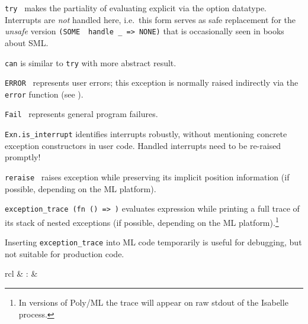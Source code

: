 \begin{isabellebody}
\begin{isamarkuptext}
  \begin{description}

  \item \verb|try|~ makes the partiality of evaluating
   explicit via the option datatype.  Interrupts are
  \emph{not} handled here, i.e.\ this form serves as safe replacement
  for the \emph{unsafe} version \verb|(SOME|~~\verb|handle _ => NONE)| that is occasionally seen in
  books about SML.

  \item \verb|can| is similar to \verb|try| with more abstract result.

  \item \verb|ERROR|~ represents user errors; this
  exception is normally raised indirectly via the \verb|error| function
  (see ).

  \item \verb|Fail|~ represents general program failures.

  \item \verb|Exn.is_interrupt| identifies interrupts robustly, without
  mentioning concrete exception constructors in user code.  Handled
  interrupts need to be re-raised promptly!

  \item \verb|reraise|~ raises exception 
  while preserving its implicit position information (if possible,
  depending on the ML platform).

  \item \verb|exception_trace|~\verb|(fn () =>|~\verb|)| evaluates expression  while printing
  a full trace of its stack of nested exceptions (if possible,
  depending on the ML platform).\footnote{In versions of Poly/ML the
  trace will appear on raw stdout of the Isabelle process.}

  Inserting \verb|exception_trace| into ML code temporarily is useful
  for debugging, but not suitable for production code.

  \end{description}%
\end{isamarkuptext}%
\isamarkuptrue%
%
\endisatagmlref
{\isafoldmlref}%
%
\isadelimmlref
%
\endisadelimmlref
%
\isadelimmlantiq
%
\endisadelimmlantiq
%
\isatagmlantiq
%
\begin{isamarkuptext}%
\begin{matharray}{rcl}
  \hypertarget{ML antiquotation.assert}{\hyperlink{ML antiquotation.assert}{\mbox{}}} & : &  \\
  \end{matharray}


\end{isamarkuptext}
\end{isabellebody}
